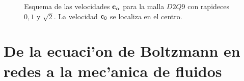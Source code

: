 \begin{figure}
\centering
%
%
%
%
\caption{\label{fig:d2q9}
Esquema de las velocidades $\textbf c_\alpha$ para la malla  $D2Q9$ con rapideces $0,1$ y $\sqrt 2$. La velocidad
$\textbf c_0$ se localiza en el centro.
}
\end{figure}



\section{De la ecuaci'on de Boltzmann  en redes a la mec'anica de fluidos}
\label{sec:hidrodinamica}



